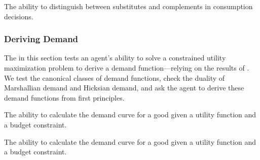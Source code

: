 \begin{el}
    {The ability to distinguish between substitutes and complements in consumption decisions.}
\end{el}

\subsubsection{Deriving Demand}\label{mod:deriving_demand}
The \child in this section tests an agent's ability to solve a constrained utility maximization problem to derive a demand function---relying on the results of . We test the canonical classes of demand functions, check the duality of Marshallian demand and Hicksian demand, and ask the agent to derive these demand functions from first principles.


\begin{el}
    {The ability to calculate the demand curve for a good given a utility function and a budget constraint.}
\end{el}



\begin{el}\label{el:deriving_hicksian_demand}
    {The ability to calculate the demand curve for a good given a utility function and a budget constraint.}
\end{el}

